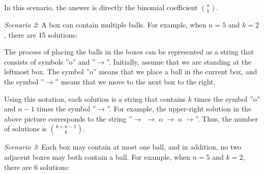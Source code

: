 In this scenario, the answer is directly the
binomial coefficient $\binom{n}{k}$.

\textit{Scenario 2}: A box can contain multiple balls.
For example, when $n=5$ and $k=2$,
there are 15 solutions:

\begin{center}
\end{center}

The process of placing the balls in the boxes
can be represented as a string
that consists of symbols
''o'' and ''$\rightarrow$''.
Initially, assume that we are standing at the leftmost box.
The symbol ''o'' means that we place a ball
in the current box, and the symbol
''$\rightarrow$'' means that we move to
the next box to the right.

Using this notation, each solution is a string
that contains $k$ times the symbol ''o'' and
$n-1$ times the symbol ''$\rightarrow$''.
For example, the upper-right solution
in the above picture corresponds to the string
''$\rightarrow$ $\rightarrow$ o $\rightarrow$ o $\rightarrow$''.
Thus, the number of solutions is
$\binom{k+n-1}{k}$.

\textit{Scenario 3}: Each box may contain at most one ball,
and in addition, no two adjacent boxes may both contain a ball.
For example, when $n=5$ and $k=2$,
there are 6 solutions:


